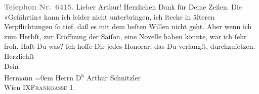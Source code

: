 \begin{ledgroupsized}[t]{13cm}
           \pstart
           \textcolor{gray}{\textbf{Telephon Nr. 6415.}}\pend
           \pstart\center{}Lieber Arthur!\pend\pstart
           Herzlichen Dank für Deine Zeilen. Die »Gefährtin« kann ich leider nicht unterbringen, ich ſtecke in älteren
               Verpflichtungen ſo tief, daß es mit dem beſten Willen nicht geht. Aber wenn ich zum
               Herbſt, zur Eröffnung der Saiſon, eine Novelle haben könnte, wär ich {\pb}ſehr froh. Haſt Du was? Ich hoffe Dir jedes
               Honorar, das Du verlangſt, durchzuſetzen.\pend
           \pstart
           Herzlichſt{\\[\baselineskip]}Dein{\\[\baselineskip]}\spacefill\mbox{Hermann}\pend
           \leftskip=0em{}\pstart
           \noindent{}Herrn \textsc{D\textsuperscript{r}} Arthur Schnitzler{\\}Wien IX\textsc{Frankgasse} 1.\pend
           \pstart
           \textcolor{gray}{\textbf{\label{T_L00898-1v}\label{T_L00898-1h}}}\pend
           
         
         \endnumbering{}\end{ledgroupsized}  \newcommand{\dateiname}{L00898}\newcommand{\titel}{Hermann Bahr an Arthur Schnitzler, 6. 3. 1899}\newcommand{\editorInnen}{ Kurt Ifkovits,  Martin Anton Müller}
      
